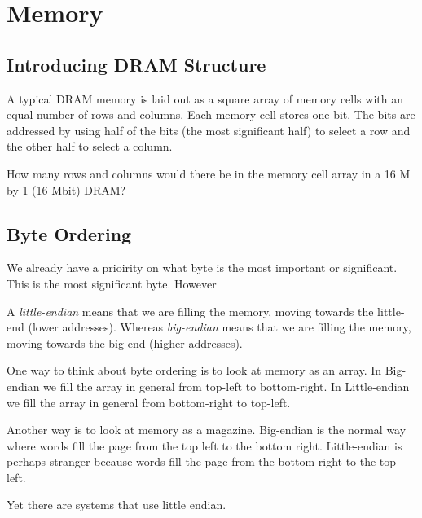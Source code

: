 

\chapter{Memory}


\section{Introducing DRAM Structure}


A typical DRAM memory is laid out as a square
array of memory cells with an equal number of rows
and columns. Each memory cell stores one bit. The
bits are addressed by using half of the bits (the most
signiﬁcant half) to select a row and the other half to
select a column.

\begin{example}

How many rows and columns would there be
in the memory cell array in a 16 M by 1 (16 Mbit) DRAM?

\end{example} 


\section{Byte Ordering}

We already have a prioirity on what byte is the most important 
or significant. This is the most significant byte. However 


A \textit{little-endian} means that we are filling the memory, 
moving towards the little-end (lower addresses).
Whereas \textit{big-endian} means that we are filling the memory, 
moving towards the big-end (higher addresses).



\begin{example}
One way to think about byte ordering is to look at memory as an array. 
In Big-endian we fill the array in general from top-left to bottom-right. 
In Little-endian we fill the array in general from bottom-right to top-left. 
\end{example}

\begin{example}
Another way is to look at memory as a magazine. 
Big-endian is the normal way where words fill the page 
from the top left to the bottom right. Little-endian is 
perhaps stranger because words fill the page from the 
bottom-right to the top-left.
\end{example}


Yet there are systems that use little endian. %